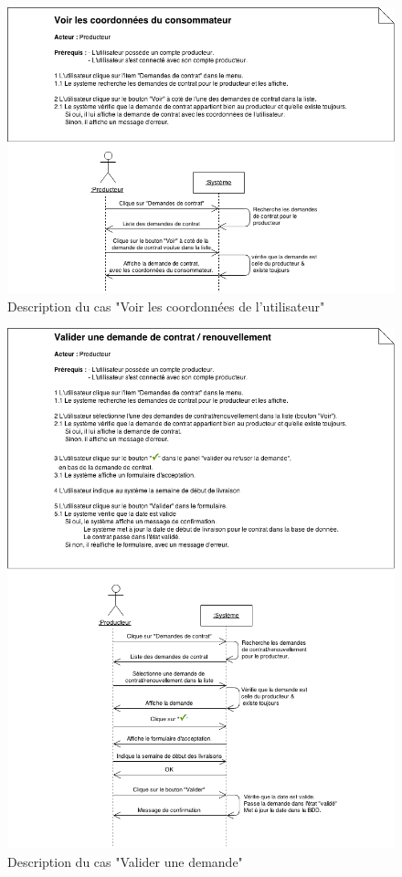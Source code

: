 \documentclass[12pt]{report}
\begin{document}
\begin{figure}[!H]
\centering
\includegraphics[width=1.\textwidth]{./ressources/desc_UC_coo_user.png}
\caption{Description du cas "Voir les coordonnées de l'utilisateur"}
\end{figure}
\clearpage

\begin{figure}[!H]
\centering
\includegraphics[width=1.\textwidth]{./ressources/desc_UC_valider_demande.png}
\caption{Description du cas "Valider une demande"}
\end{figure}
\clearpage
\end{document}
